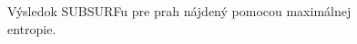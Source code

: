 \documentclass[a4paper,11pt,oneside]{article}%
\begin{document}
\begin{figure}[H]
    \hspace{5px}
    \hspace{5px}
    \caption{Výsledok SUBSURFu pre prah nájdený pomocou maximálnej entropie.}
    \label{fig:kapur_res}
\end{figure}
\end{document}
